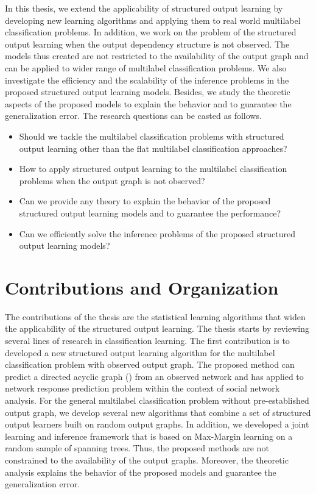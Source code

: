 In this thesis, we extend the applicability of structured output learning by developing new learning algorithms and applying them to real world multilabel classification problems.
In addition, we work on the problem of the structured output learning when the output dependency structure is not observed.
The models thus created are not restricted to the availability of the output graph and can be applied to wider range of multilabel classification problems.
We also investigate the efficiency and the scalability of the inference problems in the proposed structured output learning models.
Besides, we study the theoretic aspects of the proposed models to explain the behavior and to guarantee the generalization error.
The research questions can be casted as follows.
\begin{itemize}
\item Should we tackle the multilabel classification problems with structured output learning other than the flat multilabel classification approaches?
\item How to apply structured output learning to the multilabel classification problems when the output graph is not observed?
\item Can we provide any theory to explain the behavior of the proposed structured output learning models and to guarantee the performance?
\item Can we efficiently solve the inference problems of the proposed structured output learning models?
\end{itemize}



%
%
\section{Contributions and Organization}

The contributions of the thesis are the statistical learning algorithms that widen the applicability of the structured output learning.
The thesis starts by reviewing several lines of research in classification learning.
The first contribution is to developed a new structured output learning algorithm for the multilabel classification problem with observed output graph.
The proposed method can predict a directed acyclic graph (\daggraph) from an observed network and has applied to network response prediction problem within the context of social network analysis.
For the general multilabel classification problem without pre-established output graph, we develop several new algorithms that combine a set of structured output learners built on random output graphs.
In addition, we developed a joint learning and inference framework that is based on Max-Margin learning on a random sample of spanning trees.
Thus, the proposed methods are not constrained to the availability of the output graphs.
Moreover, the theoretic analysis explains the behavior of the proposed models and guarantee the generalization error.

